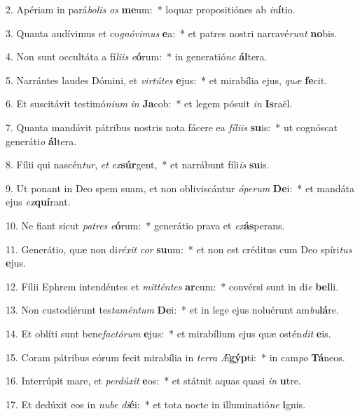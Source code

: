 2. Apériam in pará\textit{bo}\textit{lis} \textit{os} \textbf{me}um:~*  loquar propositiónes ab \textit{in}\textbf{í}tio.\

3. Quanta audívimus et co\textit{gnó}\textit{vi}\textit{mus} \textbf{e}a:~*  et patres nostri narravé\textit{runt} \textbf{no}bis.\

4. Non sunt occultáta a fí\textit{li}\textit{is} \textit{e}\textbf{ó}rum:~*  in generatió\textit{ne} \textbf{ál}tera.\

5. Narrántes laudes Dómini, et \textit{vir}\textit{tú}\textit{tes} \textbf{e}jus:~*  et mirabília ejus, \textit{quæ} \textbf{fe}cit.\

6. Et suscitávit testimó\textit{ni}\textit{um} \textit{in} \textbf{Ja}cob:~*  et legem pósuit \textit{in} \textbf{Is}raël.\

7. Quanta mandávit pátribus nostris nota fácere ea \textit{fí}\textit{li}\textit{is} \textbf{su}is:~*  ut cognóscat generáti\textit{o} \textbf{ál}tera.\

8. Fílii qui nascén\textit{tur}, \textit{et} \textit{ex}\textbf{súr}gent,~*  et narrábunt fíli\textit{is} \textbf{su}is.\

9. Ut ponant in Deo spem suam, et non obliviscántur \textit{ó}\textit{pe}\textit{rum} \textbf{De}i:~*  et mandáta ejus \textit{ex}\textbf{quí}rant.\

10. Ne fiant sicut \textit{pa}\textit{tres} \textit{e}\textbf{ó}rum:~*  generátio prava et \textit{ex}\textbf{ás}perans.\

11. Generátio, quæ non di\textit{ré}\textit{xit} \textit{cor} \textbf{su}um:~*  et non est créditus cum Deo spíri\textit{tus} \textbf{e}jus.\

12. Fílii Ephrem intendéntes et \textit{mit}\textit{tén}\textit{tes} \textbf{ar}cum:~*  convérsi sunt in di\textit{e} \textbf{bel}li.\

13. Non custodiérunt tes\textit{ta}\textit{mén}\textit{tum} \textbf{De}i:~*  et in lege ejus noluérunt am\textit{bu}\textbf{lá}re.\

14. Et oblíti sunt bene\textit{fac}\textit{tó}\textit{rum} \textbf{e}jus:~*  et mirabílium ejus quæ ostén\textit{dit} \textbf{e}is.\

15. Coram pátribus eórum fecit mirabília in \textit{ter}\textit{ra} \textit{Æ}\textbf{gýp}ti:~*  in cam\textit{po} \textbf{Tá}neos.\

16. Interrúpit mare, et \textit{per}\textit{dú}\textit{xit} \textbf{e}os:~*  et státuit aquas quasi \textit{in} \textbf{u}tre.\

17. Et dedúxit eos in \textit{nu}\textit{be} \textit{di}\textbf{é}i:~*  et tota nocte in illuminatió\textit{ne} \textbf{i}gnis.\

